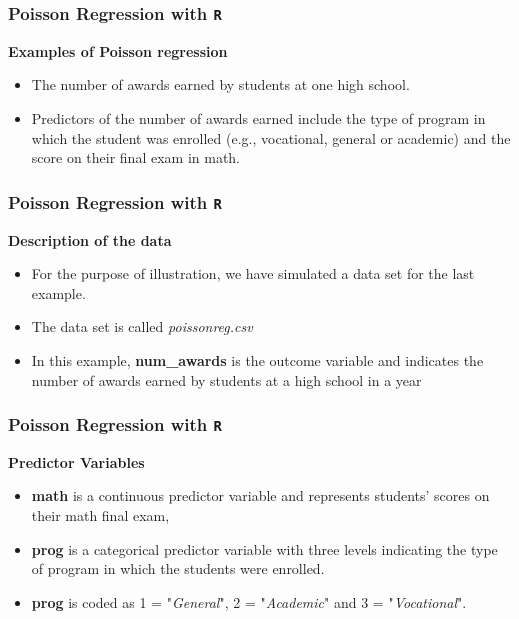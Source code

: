 \documentclass[00-GLMregslides.tex]{subfiles}
\begin{document}
\begin{frame}[fragile]

\frametitle{Poisson Regression with \texttt{R} } 
 
 \Large	
 
 \textbf{Examples of Poisson regression} \\
 	
 \begin{itemize}	
 \item The number of awards earned by students at one high school. 
 \item Predictors of the number of awards earned include the type of program in which the student was enrolled (e.g., vocational, general or academic) and the score on their final exam in math.
 \end{itemize}
 
\end{frame}


\begin{frame}[fragile]

\frametitle{Poisson Regression with \texttt{R}}
\Large
\textbf{Description of the data}

\begin{itemize}
\item For the purpose of illustration, we have simulated a data set for the last example.

\item The data set is called \textit{poissonreg.csv}  

\item In this example, \textbf{num\_awards} is the outcome variable and indicates the number of awards earned by students at a high school in a year

\end{itemize}
\end{frame}
\begin{frame}[fragile]
	
	\frametitle{Poisson Regression with \texttt{R}}
	\Large
	\textbf{Predictor Variables}
\begin{itemize}
\item \textbf{math} is a continuous predictor variable and represents students' scores on their math final exam, \item \textbf{prog} is a categorical predictor variable with three levels indicating the type of program in which the students were enrolled.

\item  \textbf{prog} is coded as 1 = "\textit{General}",
 2 = "\textit{Academic}" and 3 = "\textit{Vocational}". 
\end{itemize}

\end{frame}
\end{document}
